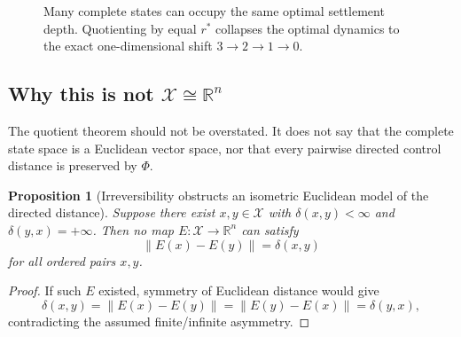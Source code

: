 \documentclass[11pt,letterpaper]{article}
\newtheorem{proposition}[theorem]{Proposition}
\theoremstyle{remark}
\newcommand{\X}{\mathcal X}
\newcommand{\R}{\mathbb R}
\newcommand{\rstar}{r^{\!*}}
\begin{document}
\begin{figure}[ht]
\centering
{}
\caption{Many complete states can occupy the same optimal settlement depth. Quotienting by equal $\rstar$ collapses the optimal dynamics to the exact one-dimensional shift $3\to2\to1\to0$.}
\label{fig:quotient}
\end{figure}

\subsection{Why this is not $\X\cong\R^n$}

The quotient theorem should not be overstated. It does not say that the complete state space is a Euclidean vector space, nor that every pairwise directed control distance is preserved by $\Phi$.

\begin{proposition}[Irreversibility obstructs an isometric Euclidean model of the directed distance]\label{prop:noeuclid}
Suppose there exist $x,y\in\X$ with $\delta(x,y)<\infty$ and $\delta(y,x)=+\infty$. Then no map $E:\X\to\R^n$ can satisfy
\[
\|E(x)-E(y)\|=\delta(x,y)
\]
for all ordered pairs $x,y$.
\end{proposition}

\begin{proof}
If such $E$ existed, symmetry of Euclidean distance would give
\[
\delta(x,y)=\|E(x)-E(y)\|=\|E(y)-E(x)\|=\delta(y,x),
\]
contradicting the assumed finite/infinite asymmetry.
\end{proof}
\end{document}
